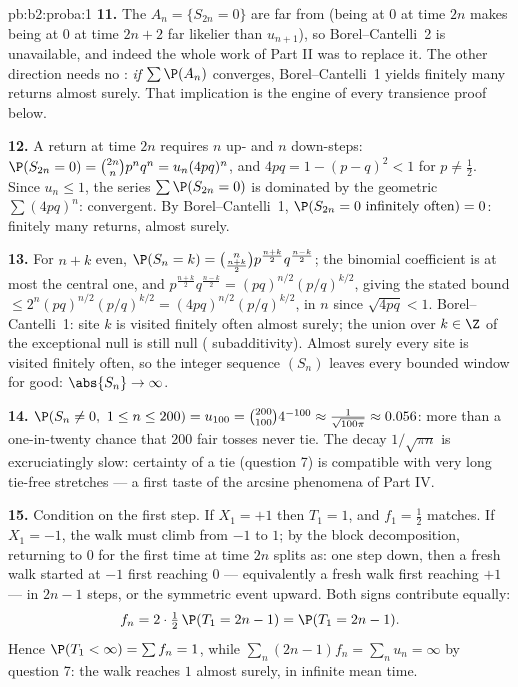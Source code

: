\begin{solution}{pb:b2:proba:1}
\textbf{11.} The  $A_n = \{S_{2n} = 0\}$ are far from
 (being at $0$ at time $2n$ makes being at $0$ at
time $2n + 2$ far likelier than $u_{n+1}$), so
Borel--Cantelli~2 is unavailable, and indeed the whole work
of Part II was to replace it. The other direction needs no
: \emph{if} $\sum\P(A_n)$ converges,
Borel--Cantelli~1 yields finitely many returns almost surely.
That implication is the engine of every transience proof
below.

\textbf{12.} A return at time $2n$ requires $n$ up- and $n$
down-steps: $\P(S_{2n} = 0) = \binom{2n}np^nq^n =
u_n(4pq)^n$, and $4pq = 1 - (p - q)^2 < 1$ for $p \neq
\frac12$. Since $u_n \leq 1$, the series $\sum\P(S_{2n} = 0)$
is dominated by the geometric $\sum(4pq)^n$: convergent. By
Borel--Cantelli~1, $\P(S_{2n} = 0 \text{ infinitely often}) =
0$: finitely many returns, almost surely.

\textbf{13.} For $n + k$ even, $\P(S_n = k) =
\binom{n}{\frac{n+k}2}p^{\frac{n+k}2}q^{\frac{n-k}2}$; the
binomial coefficient is at most the central one, and
$p^{\frac{n+k}2}q^{\frac{n-k}2} = (pq)^{n/2}(p/q)^{k/2}$,
giving the stated bound $\leq
2^n(pq)^{n/2}(p/q)^{k/2} = (4pq)^{n/2}(p/q)^{k/2}$, 
in $n$ since $\sqrt{4pq} < 1$. Borel--Cantelli~1: site $k$ is
visited finitely often almost surely; the union over $k \in
\Z$ of the exceptional null  is still null (
subadditivity). Almost surely every site is visited finitely
often, so the integer sequence $(S_n)$ leaves every bounded
window for good: $\abs{S_n} \to \infty$.

\textbf{14.} $\P(S_n \neq 0,\ 1 \leq n \leq 200) = u_{100} =
\binom{200}{100}4^{-100} \approx \frac1{\sqrt{100\pi}}
\approx 0.056$: more than a one-in-twenty chance that $200$
fair tosses never tie. The decay $1/\sqrt{\pi n}$ is
excruciatingly slow: certainty of a tie (question 7) is
compatible with very long tie-free stretches --- a first
taste of the arcsine phenomena of Part IV.

\textbf{15.} Condition on the first step. If $X_1 = +1$ then
$T_1 = 1$, and $f_1 = \frac12$ matches. If $X_1 = -1$, the
walk must climb from $-1$ to $1$; by the block decomposition,
returning to $0$ for the first time at time $2n$ splits as:
one step down, then a fresh walk started at $-1$ first
reaching $0$ --- equivalently a fresh walk first reaching
$+1$ --- in $2n - 1$ steps, or the symmetric event upward.
Both signs contribute equally:
\[
f_n = 2\cdot\tfrac12\,\P(T_1 = 2n - 1) = \P(T_1 = 2n-1) .
\]
Hence $\P(T_1 < \infty) = \sum f_n = 1$, while $\sum_n(2n -
1)f_n = \sum_n u_n = \infty$ by question 7: the walk reaches
$1$ almost surely, in infinite mean time.


\end{solution}
